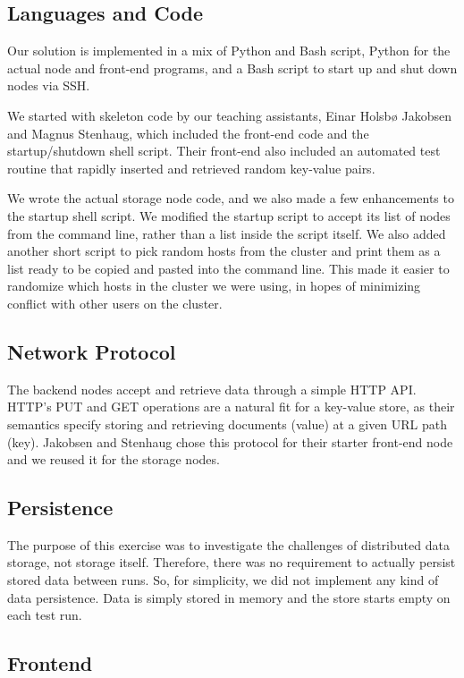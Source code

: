 \documentclass[11pt,conference]{IEEEtran}
\begin{document}
\subsection{Languages and Code}

Our solution is implemented in a mix of Python and Bash script, Python for the
actual node and front-end programs, and a Bash script to start up and shut down
nodes via SSH.

We started with skeleton code by our teaching assistants, Einar Holsbø Jakobsen
and Magnus Stenhaug, which included the front-end code and the startup/shutdown
shell script. Their front-end also included an automated test routine that
rapidly inserted and retrieved random key-value pairs.

We wrote the actual storage node code, and we also made a few enhancements to
the startup shell script. We modified the startup script to accept its list of
nodes from the command line, rather than a list inside the script itself. We
also added another short script to pick random hosts from the cluster and print
them as a list ready to be copied and pasted into the command line. This made it
easier to randomize which hosts in the cluster we were using, in hopes of
minimizing conflict with other users on the cluster.


\subsection{Network Protocol}

The backend nodes accept and retrieve data through a simple HTTP API. HTTP's PUT
and GET operations are a natural fit for a key-value store, as their semantics
specify storing and retrieving documents (value) at a given URL path (key).
Jakobsen and Stenhaug chose this protocol for their starter front-end node and
we reused it for the storage nodes.


\subsection{Persistence}

The purpose of this exercise was to investigate the challenges of distributed
data storage, not storage itself. Therefore, there was no requirement to
actually persist stored data between runs. So, for simplicity, we did not
implement any kind of data persistence. Data is simply stored in memory and the
store starts empty on each test run.


\subsection{Frontend}
\end{document}
